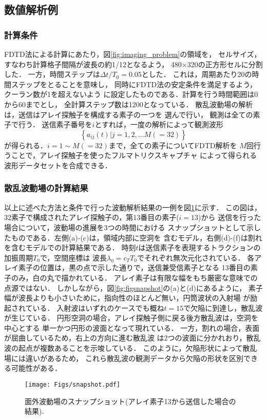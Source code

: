 \subsection{数値解析例}
\subsubsection{計算条件}
FDTD法による計算にあたり，図\ref{fig:imaging_problem}の領域を，
セルサイズ，すなわち計算格子間隔が波長の約1/12となるよう，
480$\times$320の正方形セルに分割した．
一方，時間ステップは$\Delta t/T_0=0.05$とした．
これは，周期あたり20の時間ステップをとることを意味し，
同時にFDTD法の安定条件を満足するよう，クーラン数が1を超えないよう
に設定したものである．計算を行う時間範囲は0から60までとし，
全計算ステップ数は1200となっている．
散乱波動場の解析は，送信はアレイ探触子を構成する素子の一つを
選んで行い， 観測は全ての素子で行う．
送信素子番号を$i$とすれば，一度の解析によって観測波形
\[
	\left\{ a_{ij}(t) \left| j=1,2,\dots M(=32)\right. \right\}
\]
が得られる．$i=1\sim M(=32)$まで，全ての素子についてFDTD解析を
$M$回行うことで，アレイ探触子を使ったフルマトリクスキャプチャ
によって得られる波形データセットを合成できる．
\subsubsection{散乱波動場の計算結果}
以上に述べた方法と条件で行った波動解析結果の一例を図\ref{fig:snapshot}に示す．
この図は，32素子で構成されたアレイ探触子の，第13番目の素子($i=13$)から
送信を行った場合について，波動場の進展を3つの時間における
スナップショットとして示したものである．左側(a)-(c)は，領域内部に空洞を
含むモデル，右側(d)-(f)は割れを含むモデルでの計算結果である．
時刻$t$は送信素子を表現するトラクションの加振周期$T_0$で，空間座標は
波長$\lambda_0=c_TT_0$でそれぞれ無次元化されている．
各アレイ素子の位置は，黒の点で示した通りで，送信兼受信素子となる
13番目の素子のみ，白の丸で描かれている．
アレイ素子は有限な幅をもち厳密な意味での点源ではない．
しかしながら，図\ref{fig:figsnapshot}の(a)と(d)にあるように，
素子幅が波長よりも小さいために，指向性のほとんど無い，円筒波状の入射場
が励起されている．
入射波はいずれのケースでも概ね$t=15$で欠陥に到達し，散乱波が生じている．
円形空洞の場合，アレイ探触子側に戻る後方散乱波は，空洞を中心とする
単一かつ円形の波面となって現れている．
一方，割れの場合，表面が屈曲しているため，右上の方向に進む散乱波
は2つの波面に分かれおり，散乱波の起点が複数あることを示唆している．
このように，欠陥形状によって散乱場には違いがあるため，
これら散乱波の観測データから欠陥の形状を区別できる可能性がある．
\begin{figure}[h]
	\begin{center}
	\texttt{[image: Figs/snapshot.pdf]} 
	\end{center}
	\caption{面外波動場のスナップショット(アレイ素子13から送信した場合の結果).} 
	\label{fig:snapshot}
\end{figure}
%
